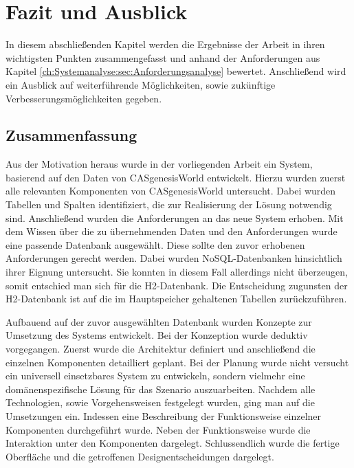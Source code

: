 
\chapter{Fazit und Ausblick}
\label{ch:Ergebnis}

In diesem abschließenden Kapitel werden die Ergebnisse der Arbeit in ihren wichtigsten Punkten zusammengefasst und anhand der Anforderungen aus Kapitel \ref{ch:Systemanalyse:sec:Anforderungsanalyse} bewertet. Anschließend wird ein Ausblick auf weiterführende Möglichkeiten, sowie zukünftige Verbesserungsmöglichkeiten gegeben. 

\section{Zusammenfassung}
\label{ch:Ergebnis:sec:zusammenfassung}

Aus der Motivation heraus wurde in der vorliegenden Arbeit ein System, basierend auf den Daten von CASgenesisWorld entwickelt. Hierzu wurden zuerst alle relevanten Komponenten von CASgenesisWorld untersucht. Dabei wurden Tabellen und Spalten identifiziert, die zur Realisierung der Lösung notwendig sind. Anschließend wurden die Anforderungen an das neue System erhoben. Mit dem Wissen über die zu übernehmenden Daten und den Anforderungen wurde eine passende Datenbank ausgewählt. Diese sollte den zuvor erhobenen Anforderungen gerecht werden. Dabei wurden NoSQL-Datenbanken hinsichtlich ihrer Eignung untersucht. Sie konnten in diesem Fall allerdings nicht überzeugen, somit entschied man sich für die H2-Datenbank. Die Entscheidung zugunsten der H2-Datenbank ist auf die im Hauptspeicher gehaltenen Tabellen zurückzuführen.   

Aufbauend auf der zuvor ausgewählten Datenbank wurden Konzepte zur Umsetzung des Systems entwickelt. Bei der Konzeption wurde deduktiv vorgegangen. Zuerst wurde die Architektur definiert und anschließend die einzelnen Komponenten detailliert geplant. Bei der Planung wurde nicht versucht ein universell einsetzbares System zu entwickeln, sondern vielmehr eine domänenspezifische Lösung für das Szenario auszuarbeiten. Nachdem alle Technologien, sowie Vorgehensweisen festgelegt wurden, ging man auf die Umsetzungen ein. Indessen eine Beschreibung der Funktionsweise einzelner Komponenten durchgeführt wurde. Neben der Funktionsweise wurde die Interaktion unter den Komponenten dargelegt. Schlussendlich wurde die fertige Oberfläche und die getroffenen Designentscheidungen dargelegt.
 
